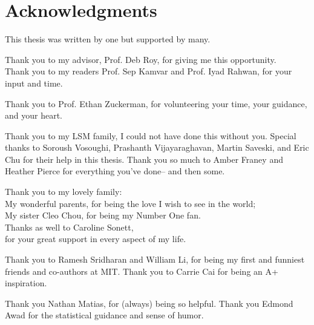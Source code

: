  
\section*{Acknowledgments}
 
 
This thesis was written by one but supported by many.

Thank you to my advisor, Prof. Deb Roy, for giving me this opportunity.\\
Thank you to my readers Prof. Sep Kamvar and Prof. Iyad Rahwan, for your input and time.

Thank you to Prof. Ethan Zuckerman, for volunteering your time, your guidance, and your heart. 


Thank you to my LSM family, I could not have done this without you. Special thanks to Soroush Vosoughi, Prashanth Vijayaraghavan, Martin Saveski, and Eric Chu for their help in this thesis. Thank you so much to Amber Franey and Heather Pierce for everything you've done-- and then some.


Thank you to my lovely family: \\
My wonderful parents, for being the love I wish to see in the world;  \\
My sister Cleo Chou, for being my Number One fan.  \\
Thanks as well to Caroline Sonett, \\ 
for your great support in every aspect of my life.
  
Thank you to Ramesh Sridharan and William Li, for being my first and funniest friends and co-authors at MIT. Thank you to Carrie Cai for being an A+ inspiration.

Thank you Nathan Matias, for (always) being so helpful. Thank you Edmond Awad for the statistical guidance and sense of humor. 

